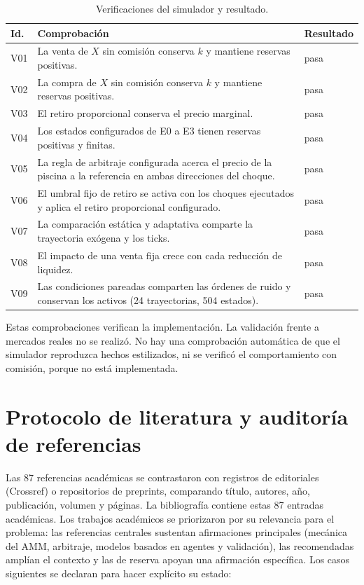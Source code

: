 \begin{table}[htbp]
\centering
\caption{Verificaciones del simulador y resultado.}
\label{tab:verificacion}
\small
\begin{tabularx}{\textwidth}{@{}l X l@{}}
\toprule
Id. & Comprobación & Resultado \\
\midrule
V01 & La venta de $X$ sin comisión conserva $k$ y mantiene reservas positivas. & pasa \\
V02 & La compra de $X$ sin comisión conserva $k$ y mantiene reservas positivas. & pasa \\
V03 & El retiro proporcional conserva el precio marginal. & pasa \\
V04 & Los estados configurados de E0 a E3 tienen reservas positivas y finitas. & pasa \\
V05 & La regla de arbitraje configurada acerca el precio de la piscina a la referencia en ambas direcciones del choque. & pasa \\
V06 & El umbral fijo de retiro se activa con los choques ejecutados y aplica el retiro proporcional configurado. & pasa \\
V07 & La comparación estática y adaptativa comparte la trayectoria exógena y los ticks. & pasa \\
V08 & El impacto de una venta fija crece con cada reducción de liquidez. & pasa \\
V09 & Las condiciones pareadas comparten las órdenes de ruido y conservan los activos (24 trayectorias, 504 estados). & pasa \\
\bottomrule
\end{tabularx}
\end{table}

Estas comprobaciones verifican la implementación. La validación frente a mercados reales no se realizó. No hay una comprobación automática de que el simulador reproduzca hechos estilizados, ni se verificó el comportamiento con comisión, porque no está implementada.

\section{Protocolo de literatura y auditoría de referencias}
\label{sec:protocolo-literatura}

Las 87 referencias académicas se contrastaron con registros de editoriales (Crossref) o repositorios de preprints, comparando título, autores, año, publicación, volumen y páginas. La bibliografía contiene estas 87 entradas académicas. Los trabajos académicos se priorizaron por su relevancia para el problema: las referencias centrales sustentan afirmaciones principales (mecánica del AMM, arbitraje, modelos basados en agentes y validación), las recomendadas amplían el contexto y las de reserva apoyan una afirmación específica. Los casos siguientes se declaran para hacer explícito su estado:

